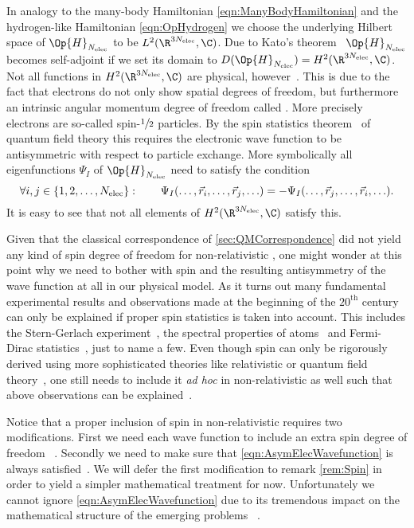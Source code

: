 In analogy to the many-body Hamiltonian \eqref{eqn:ManyBodyHamiltonian}
and the hydrogen-like Hamiltonian \eqref{eqn:OpHydrogen}
we choose the underlying Hilbert space of $\Op{H}_{\Nelec}$
to be $L^2(\R^{3\Nelec}, \C)$.
Due to Kato's theorem~\cite{Kato1951} $\Op{H}_{\Nelec}$
becomes self-adjoint if we set its domain to $D(\Op{H}_{\Nelec}) = H^2(\R^{3\Nelec}, \C)$.
Not all functions in $H^2(\R^{3\Nelec}, \C)$ are physical, however~\cite{Mueller2000,Shankar1994}.
This is due to the fact that electrons do not only show spatial degrees of freedom,
but furthermore an intrinsic angular momentum degree of freedom
called .
More precisely electrons are so-called spin-$\sfrac12$ particles.
By the spin statistics theorem~\cite{Shankar1994} of quantum field theory
this requires the electronic wave function
to be antisymmetric with respect to particle exchange.
More symbolically all eigenfunctions $\Psi_I$ of $\Op{H}_{\Nelec}$
need to satisfy the condition
\begin{equation}
	\forall i,j \in \{1, 2, \ldots, N_\text{elec}\}: \qquad
	  \Psi_I(\ldots, \vec{r}_i, \ldots, \vec{r}_j, \ldots) =
	- \Psi_I(\ldots, \vec{r}_j, \ldots, \vec{r}_i, \ldots).
	\label{eqn:AsymElecWavefunction}
\end{equation}
It is easy to see that not all elements of $H^2(\R^{3\Nelec}, \C)$ satisfy this.

Given that the classical correspondence
of \vref{sec:QMCorrespondence} did not yield any kind of spin degree of freedom
for non-relativistic \QM,
one might wonder at this point
why we need to bother with spin and the resulting
antisymmetry of the wave function at all in our physical model.
As it turns out many fundamental experimental results
and observations made at the beginning of the $20^\text{th}$ century
can only be explained if proper spin statistics is taken into account.
This includes the Stern-Gerlach experiment~\cite{Gerlach1922b,Gerlach1922,Gerlach1922a},
the spectral properties of atoms~\cite{Pauli1925}
and Fermi-Dirac statistics~\cite{Dirac1926},
just to name a few.
Even though spin can only be rigorously derived
using more sophisticated theories like
relativistic \QM or quantum field theory~\cite{Shankar1994},
one still needs to include it \textit{ad hoc} in non-relativistic \QM as well
such that above observations can be explained~\cite{Pauli1925,Shankar1994,Straumann2004}.

Notice that a proper inclusion of spin in non-relativistic \QM
requires two modifications.
First we need each wave function to include an extra spin degree of freedom%
~\cite{Pauli1925}.
Secondly we need to make sure that \eqref{eqn:AsymElecWavefunction}
is always satisfied~\cite{Dirac1926}.
We will defer the first modification to remark \vref{rem:Spin}
in order to yield a simpler mathematical treatment for now.
Unfortunately we cannot ignore \eqref{eqn:AsymElecWavefunction}
due to its tremendous impact on the mathematical structure of the emerging problems%
~\cite{Dirac1926,Fock1930}.

